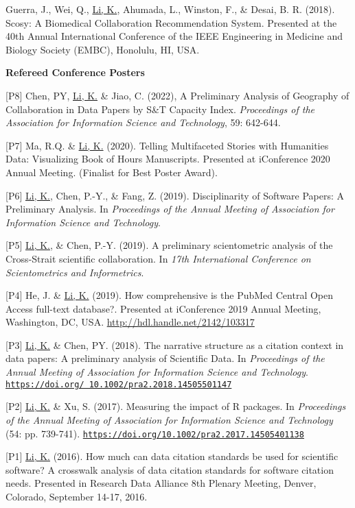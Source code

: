 \documentclass[margin, 10pt]{res} %
\begin{document}
\begin{resume}
[S1] Guerra, J., Wei, Q., \underline{Li, K.}, Ahumada, L., Winston, F., \& Desai, B. R. (2018). Scosy: A Biomedical Collaboration Recommendation System. Presented at the 40th Annual International Conference of the IEEE Engineering in Medicine and Biology Society (EMBC), Honolulu, HI, USA.

\textbf{Refereed Conference Posters}

[P8] Chen, PY, \underline{Li, K.} \& Jiao, C. (2022), A Preliminary Analysis of Geography of Collaboration in Data Papers by S\&T Capacity Index. \textit{Proceedings of the Association for Information Science and Technology}, 59: 642-644.

[P7] Ma, R.Q. \& \underline{Li, K.} (2020). Telling Multifaceted Stories with Humanities Data: Visualizing Book of Hours Manuscripts. Presented at iConference 2020 Annual Meeting. (Finalist for Best Poster Award).

[P6] \underline{Li, K.}, Chen, P.-Y., \& Fang, Z. (2019). Disciplinarity of Software Papers: A Preliminary Analysis. In \textit{Proceedings of the Annual Meeting of Association for Information Science and Technology}.

[P5] \underline{Li, K.}, \& Chen, P.-Y. (2019). A preliminary scientometric analysis of the Cross-Strait scientific collaboration. In \textit{17th International Conference on Scientometrics and Informetrics}.

[P4] He, J. \& \underline{Li, K.} (2019). How comprehensive is the PubMed Central Open Access full-text database?. Presented at iConference 2019 Annual Meeting, Washington, DC, USA. \href{http://hdl.handle.net/2142/103317}{http://hdl.handle.net/2142/103317}

[P3] \underline{Li, K.} \& Chen, PY. (2018). The narrative structure as a citation context in data papers: A preliminary analysis of Scientific Data. In \textit{Proceedings of the Annual Meeting of Association for Information Science and Technology}. \href{https://doi.org/10.1002/pra2.2018.14505501147}{\nolinkurl{https://doi.org/ 10.1002/pra2.2018.14505501147}}

[P2] \underline{Li, K.} \& Xu, S. (2017). Measuring the impact of R packages. In \textit{Proceedings of the Annual Meeting of Association for Information Science and Technology} (54: pp. 739-741). \href{https://doi.org/10.1002/pra2.2017.14505401138}{\nolinkurl{https://doi.org/10.1002/pra2.2017.14505401138}}

[P1] \underline{Li, K.} (2016). How much can data citation standards be used for scientific software? A crosswalk analysis of data citation standards for software citation needs. Presented in Research Data Alliance 8th Plenary Meeting, Denver, Colorado, September 14-17, 2016.


\end{resume}
\end{document}
